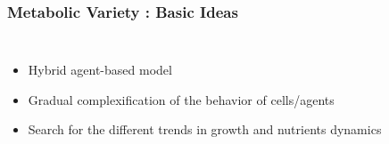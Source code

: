 \documentclass{beamer}
\begin{document}
\begin{frame}
\frametitle{Metabolic Variety : Basic Ideas}

	 \begin{columns}
	 	\column{50mm}
		
		\column{40mm}
		\begin{itemize}
		\item  Hybrid agent-based model
		\item  Gradual complexification of the behavior of cells/agents
		\item Search for the different trends in growth and nutrients dynamics 
		\end{itemize}
	\end{columns}
\end{frame}
\end{document}
